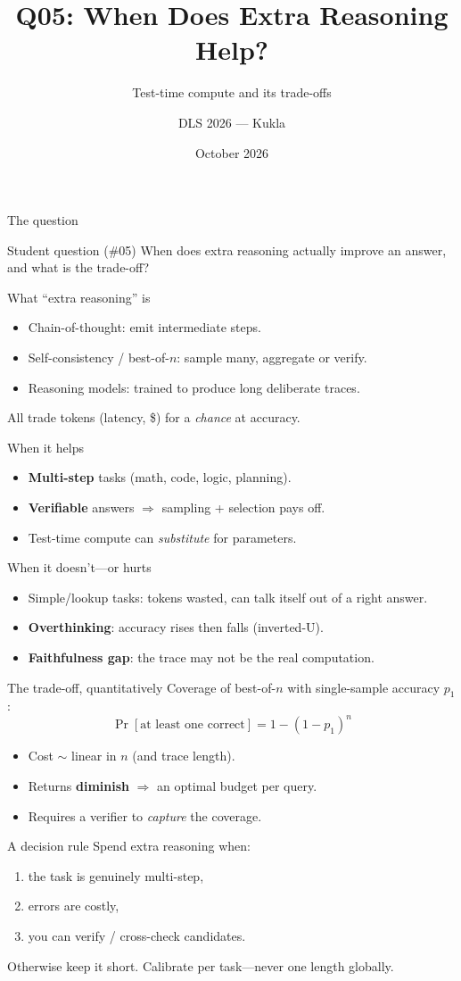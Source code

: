 \documentclass[aspectratio=169,10pt]{beamer}
\title{Q05: When Does Extra Reasoning Help?}
\subtitle{Test-time compute and its trade-offs}
\author{DLS 2026 --- Kukla}
\date{October 2026}
\begin{document}
\maketitle

\begin{frame}{The question}
\begin{block}{Student question (\#05)}
When does extra reasoning actually improve an answer, and what is the trade-off?
\end{block}
\end{frame}
\begin{frame}{What ``extra reasoning'' is}
\begin{itemize}
\item Chain-of-thought: emit intermediate steps.
\item Self-consistency / best-of-$n$: sample many, aggregate or verify.
\item Reasoning models: trained to produce long deliberate traces.
\end{itemize}
\alert{All trade tokens (latency, \$) for a \emph{chance} at accuracy.}
\end{frame}
\begin{frame}{When it helps}
\begin{itemize}
\item \textbf{Multi-step} tasks (math, code, logic, planning).
\item \textbf{Verifiable} answers $\Rightarrow$ sampling + selection pays off.
\item Test-time compute can \emph{substitute} for parameters.
\end{itemize}
\end{frame}
\begin{frame}{When it doesn't---or hurts}
\begin{itemize}
\item Simple/lookup tasks: tokens wasted, can talk itself out of a right answer.
\item \textbf{Overthinking}: accuracy rises then falls (inverted-U).
\item \textbf{Faithfulness gap}: the trace may not be the real computation.
\end{itemize}
\end{frame}
\begin{frame}{The trade-off, quantitatively}
Coverage of best-of-$n$ with single-sample accuracy $p_1$:
\[ \Pr[\text{at least one correct}] = 1-(1-p_1)^n \]
\begin{itemize}
\item Cost $\sim$ linear in $n$ (and trace length).
\item Returns \textbf{diminish} $\Rightarrow$ an optimal budget per query.
\item Requires a verifier to \emph{capture} the coverage.
\end{itemize}
\end{frame}
\begin{frame}{A decision rule}
Spend extra reasoning when:
\begin{enumerate}
\item the task is genuinely multi-step,
\item errors are costly,
\item you can verify / cross-check candidates.
\end{enumerate}
Otherwise keep it short. \alert{Calibrate per task---never one length globally.}
\end{frame}
\end{document}
